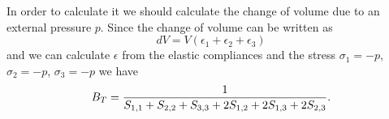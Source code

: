 \documentclass[12pt,a4paper]{article}
\begin{document}
In order to calculate it we should calculate the change of volume
due to an external pressure $p$. Since the change of volume can be
written as 
\begin{equation}
dV = V (\epsilon_1 + \epsilon_2 + \epsilon_3)
\end{equation}
and we can calculate $\epsilon$ from the elastic compliances and the
stress $\sigma_1=-p$, $\sigma_2=-p$, $\sigma_3=-p$ we have
\begin{equation}
B_T = {1 \over S_{1,1}+S_{2,2}+S_{3,3}+2 S_{1,2}+2 S_{1,3}+2 S_{2,3}}.
\end{equation}

\newpage
\end{document}
